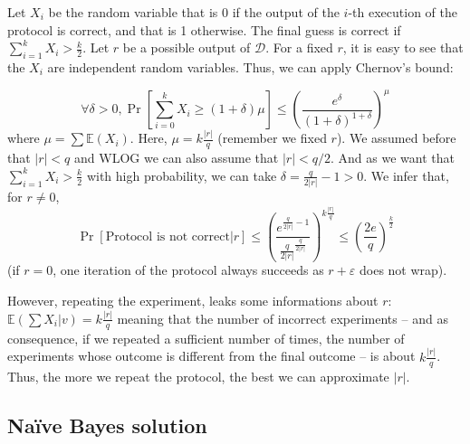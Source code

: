 \documentclass[11pt]{article}
\begin{document}
Let $X_i$ be the random variable that is 0 if the output of the $i$-th execution of the protocol is correct, and that is 1 otherwise. The final guess is correct if $\sum_{i=1}^k X_i > \frac{k}{2}$. Let $r$ be a possible output of $\mathcal{D}$. For a fixed $r$, it is easy to see that the $X_i$ are independent random variables. Thus, we can apply Chernov's bound:

\[
    \forall \delta > 0,  \Pr\left[ \sum_{i=0}^k X_i \geq (1 + \delta)\mu\right] \leq \left( \frac{e^\delta}{(1+\delta)^{1+\delta}} \right)^\mu
\]
where $\mu = \sum \mathbb{E}(X_i)$. Here, $\mu = k \frac{|r|}{q}$ (remember we fixed $r$). We assumed before that $|r| < q$ and WLOG we can also assume that $|r| < q/2$. And as we want that  $\sum_{i=1}^k X_i > \frac{k}{2}$ with high probability, we can take $\delta = \frac{q}{2|r|} -1 > 0$. We infer that, for $r \neq 0$,
\[
	\Pr[\text{Protocol is not correct} | r] \leq \left(\frac{e^{\frac{q}{2|r|} -1}}{\frac{q}{2|r|}^{\frac{q}{2|r|}}}\right)^{k \frac{|r|}{q}} 
	\leq \left(\frac{2e}{q}\right)^{\frac{k}{2}}
\]
(if $r = 0$, one iteration of the protocol always succeeds as $r + \varepsilon$ does not wrap).


However, repeating the experiment, leaks some informations about $r$: $\mathbb{E}(\sum X_i | v) = k \frac{|r|}{q}$ meaning that the number of incorrect experiments -- and as consequence, if we repeated a sufficient number of times, the number of experiments whose outcome is different from the final outcome -- is about $k \frac{|r|}{q}$. Thus, the more we repeat the protocol, the best we can approximate $|r|$.




\subsection{Na\"ive Bayes solution}

%
\newcommand{\NB}{Na\"ive Bayes}
\end{document}

